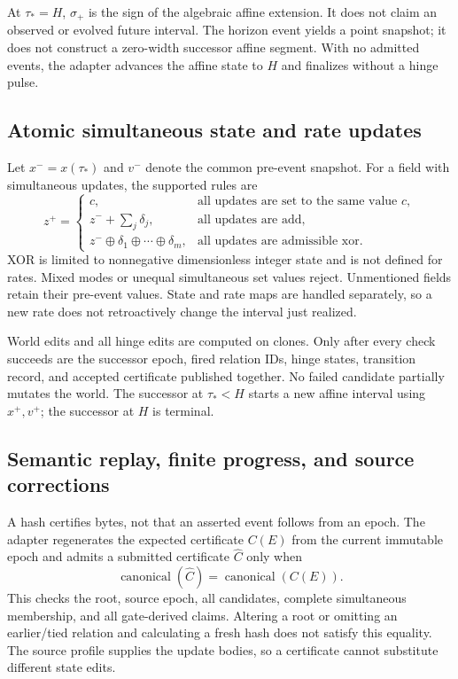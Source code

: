 At $\tau_*=H$, $\sigma_+$ is the sign of the algebraic affine extension.
It does not claim an observed or evolved future interval. The horizon
event yields a  point snapshot; it does not construct
a zero-width successor affine segment. With no admitted events, the
adapter advances the affine state to $H$ and finalizes without a hinge
pulse.

\subsection{Atomic simultaneous state and rate updates}

Let $x^-=x(\tau_*)$ and $v^-$ denote the common pre-event snapshot.
For a field with simultaneous updates, the supported rules are
\begin{equation}
 z^+=\begin{cases}
 c,&\text{all updates are set to the same value }c,\\
 z^-+\sum_j\delta_j,&\text{all updates are add},\\
 z^-\oplus\delta_1\oplus\cdots\oplus\delta_m,
      &\text{all updates are admissible xor}.
 \end{cases}
 \label{eq:r16-simultaneous-updates}
\end{equation}
XOR is limited to nonnegative dimensionless integer state and is not
defined for rates. Mixed modes or unequal simultaneous set values
reject. Unmentioned fields retain their pre-event values. State and
rate maps are handled separately, so a new rate does not retroactively
change the interval just realized.

World edits and all hinge edits are computed on clones. Only after
every check succeeds are the successor epoch, fired relation IDs,
hinge states, transition record, and accepted certificate published
together. No failed candidate partially mutates the world. The successor
at $\tau_*<H$ starts a new affine interval using $x^+,v^+$; the successor
at $H$ is terminal.

\subsection{Semantic replay, finite progress, and source corrections}

A hash certifies bytes, not that an asserted event follows from an epoch.
The adapter regenerates the expected certificate $C(E)$ from the current
immutable epoch and admits a submitted certificate $\widehat C$ only when
\begin{equation}
 \operatorname{canonical}(\widehat C)
       =\operatorname{canonical}(C(E)).
 \label{eq:r16-semantic-admission}
\end{equation}
This checks the root, source epoch, all candidates, complete simultaneous
membership, and all gate-derived claims. Altering a root or omitting an
earlier/tied relation and calculating a fresh hash does not satisfy this
equality. The source profile supplies the update bodies, so a certificate
cannot substitute different state edits.

